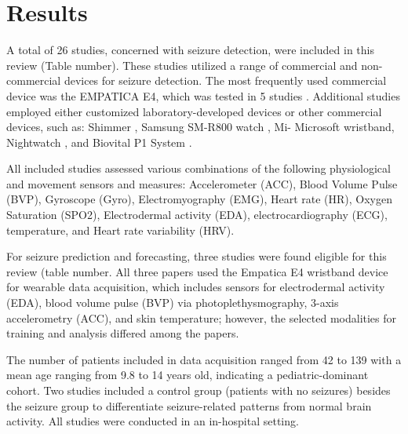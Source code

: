 \section{Results}

A total of 26 studies, concerned with seizure detection, were included in this review (Table number). These studies utilized a range of commercial and non-commercial devices for seizure detection. The most frequently used commercial device was the EMPATICA E4, which was tested in 5 studies \cite{Yu2023-ss, Regalia2019-ch,Nasseri2021-xn, Tang2021-td}. Additional studies employed either customized laboratory-developed devices or other commercial devices, such as: Shimmer \cite{Van_Andel2017-yx, Gheryani2017-yg}, Samsung SM-R800 watch \cite{Vakilna2024-hk}, Mi- Microsoft wristband\cite{Jiang2022-zu}, Nightwatch \cite{Arends2018-ew}, and Biovital P1 System \cite{Wu2024-yl, Wang2025-ql}.

All included studies assessed various combinations of the following physiological and movement sensors and measures: Accelerometer (ACC), Blood Volume Pulse (BVP), Gyroscope (Gyro), Electromyography (EMG), Heart rate (HR), Oxygen Saturation (SPO2), Electrodermal activity (EDA), electrocardiography (ECG), temperature, and Heart rate variability (HRV).

For seizure prediction and forecasting, three studies were found eligible for this review (table number. All three papers used the Empatica E4 wristband device for wearable data acquisition, which includes sensors for electrodermal activity (EDA), blood volume pulse (BVP) via photoplethysmography, 3-axis accelerometry (ACC), and skin temperature; however, the selected modalities for training and analysis differed among the papers.

The number of patients included in data acquisition ranged from 42 \cite{Vieluf2023-ta} to 139 \cite{Vieluf2023-zv} with a mean age ranging from 9.8 \cite{Meisel2020-ii} to 14 \cite{Vieluf2023-ta} years old, indicating a pediatric-dominant cohort. Two studies \cite{Vieluf2023-ta, Vieluf2023-zv} included a control group (patients with no seizures) besides the seizure group to differentiate seizure-related patterns from normal brain activity. All studies were conducted in an in-hospital setting.







